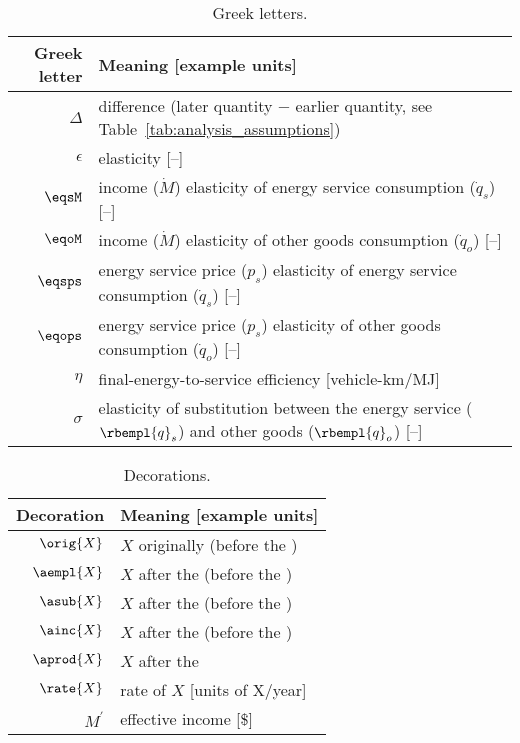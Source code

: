 
\begin{table}
\centering %
\caption{Greek letters.}
\begin{tabular}{r l}
  \toprule
  Greek letter & Meaning [example units] \\
  \midrule
  $\Delta$ & difference (later quantity $-$ earlier quantity, see Table~\ref{tab:analysis_assumptions}) \\
  $\epsilon$ & elasticity [--] \\
  $\eqsM$  & income ($\dot{M}$) elasticity of energy service consumption ($\dot{q}_s$) [--] \\
  $\eqoM$  & income ($\dot{M}$) elasticity of other goods consumption ($\dot{q}_o$) [--] \\
  $\eqsps$ & energy service price ($p_s$) elasticity of energy service consumption ($\dot{q}_s$) [--] \\
  $\eqops$ & energy service price ($p_s$) elasticity of other goods consumption ($\dot{q}_o$) [--] \\
  $\eta$ & final-energy-to-service efficiency [vehicle-km/MJ] \\
  $\sigma$ & elasticity of substitution between the energy service ($\rbempl{q}_s$) and other goods ($\rbempl{q}_o$) [--] \\
  \bottomrule
\end{tabular}
\label{tab:greek}
\end{table}



\begin{table}
\centering %
\caption{Decorations.}
\begin{tabular}{r l}
  \toprule
  Decoration & Meaning [example units] \\
  \midrule
  $\orig{X}$ & $X$ originally (before the \empleffect{}) \\
  $\aempl{X}$  & $X$ after the \empleffect{} (before the \subeffect{}) \\
  $\asub{X}$ & $X$ after the \subeffect{} (before the \inceffect{}) \\
  $\ainc{X}$ & $X$ after the \inceffect{} (before the \prodeffect{}) \\
  $\aprod{X}$ & $X$ after the \prodeffect{} \\
  $\rate{X}$ & rate of $X$ [units of X/year] \\
  $M^\prime$ & effective income [\$] \\
  \bottomrule
\end{tabular}
\label{tab:decorations}
\end{table}


